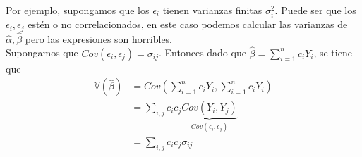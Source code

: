 \documentclass[10pt]{article}
\theoremstyle{plain}
\theoremstyle{definition}
\begin{document}
Por ejemplo, supongamos que los $\epsilon_{i}$ tienen varianzas finitas $\sigma_{i}^2$. Puede ser que los $\epsilon_{i},\epsilon_{j}$ estén o no correlacionados, en este caso podemos calcular las varianzas de $\hat{\alpha},\hat{\beta}$ pero las expresiones son horribles.\\

Supongamos que $Cov(\epsilon_{i},\epsilon_{j}) = \sigma_{ij}$. Entonces dado que $\hat{\beta} = \sum_{i=1}^n c_{i} Y_{i}$, se tiene que
\begin{align*}
\mathbb{V}(\hat{\beta}) &= Cov\left(\sum_{i=1}^n c_{i} Y_{i},\sum_{i=1}^n c_{i} Y_{i}\right)\\
&= \sum_{i,j} c_{i}c_{j} \underbrace{Cov (Y_{i},Y_{j})}_{Cov (\epsilon_{i},\epsilon_{j})}\\
&= \sum_{i,j} c_{i}c_{j}\sigma_{ij}
\end{align*}
\end{document}
